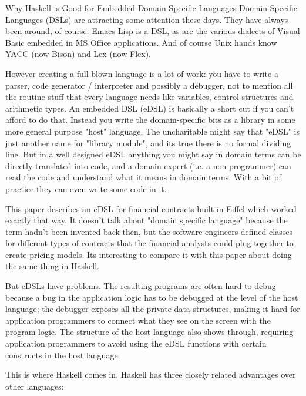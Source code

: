 \documentclass[proposal.tex]{subfiles}
\begin{document}
\begin{enumerate}
Why Haskell is Good for Embedded Domain Specific Languages
Domain Specific Languages (DSLs) are attracting some attention these days. They have always been around, of course: Emacs Lisp is a DSL, as are the various dialects of Visual Basic embedded in MS Office applications. And of course Unix hands know YACC (now Bison) and Lex (now Flex).

However creating a full-blown language is a lot of work: you have to write a parser, code generator / interpreter and possibly a debugger, not to mention all the routine stuff that every language needs like variables, control structures and arithmetic types. An embedded DSL (eDSL) is basically a short cut if you can't afford to do that. Instead you write the domain-specific bits as a library in some more general purpose "host" language. The uncharitable might say that "eDSL" is just another name for "library module", and its true there is no formal dividing line. But in a well designed eDSL anything you might say in domain terms can be directly translated into code, and a domain expert (i.e. a non-programmer) can read the code and understand what it means in domain terms. With a bit of practice they can even write some code in it.

This paper describes an eDSL for financial contracts built in Eiffel which worked exactly that way. It doesn't talk about "domain specific language" because the term hadn't been invented back then, but the software engineers defined classes for different types of contracts that the financial analysts could plug together to create pricing models. Its interesting to compare it with this paper about doing the same thing in Haskell.

But eDSLs have problems. The resulting programs are often hard to debug because a bug in the application logic has to be debugged at the level of the host language; the debugger exposes all the private data structures, making it hard for application programmers to connect what they see on the screen with the program logic. The structure of the host language also shows through, requiring application programmers to avoid using the eDSL functions with certain constructs in the host language.

This is where Haskell comes in. Haskell has three closely related advantages over other languages:



\end{enumerate}
\end{document}

